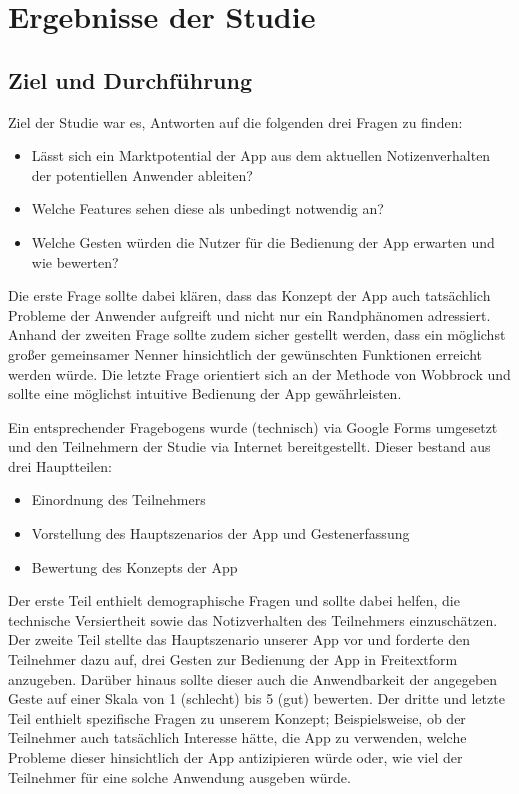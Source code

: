 \documentclass{chi-ext}
\begin{document}
\section{Ergebnisse der Studie}

\subsection{Ziel und Durchführung}
Ziel der Studie war es, Antworten auf die folgenden drei Fragen zu finden:
\begin{itemize}
\item Lässt sich ein Marktpotential der App aus dem aktuellen Notizenverhalten der potentiellen Anwender ableiten?
\item Welche Features sehen diese als unbedingt notwendig an?
\item Welche Gesten würden die Nutzer für die Bedienung der App erwarten und wie bewerten?
\end{itemize}

Die erste Frage sollte dabei klären, dass das Konzept der App auch tatsächlich Probleme der Anwender aufgreift und nicht nur ein Randphänomen adressiert. Anhand der zweiten Frage sollte zudem sicher gestellt werden, dass ein möglichst großer gemeinsamer Nenner hinsichtlich der gewünschten Funktionen erreicht werden würde. Die letzte Frage orientiert sich an der Methode von Wobbrock \cite{Wobbrock} und sollte eine möglichst intuitive Bedienung der App gewährleisten.

Ein entsprechender Fragebogens wurde (technisch) via Google Forms umgesetzt und den Teilnehmern der Studie via Internet bereitgestellt. Dieser bestand aus drei Hauptteilen:

\begin{itemize}
\item Einordnung des Teilnehmers
\item Vorstellung des Hauptszenarios der App und Gestenerfassung
\item Bewertung des Konzepts der App
\end{itemize}

Der erste Teil enthielt demographische Fragen und sollte dabei helfen, die technische Versiertheit sowie das Notizverhalten des Teilnehmers einzuschätzen.
Der zweite Teil stellte das Hauptszenario unserer App vor und forderte den Teilnehmer dazu auf, drei Gesten zur Bedienung der App in Freitextform anzugeben. Darüber hinaus sollte dieser auch die Anwendbarkeit der angegeben Geste auf einer Skala von 1 (schlecht) bis 5 (gut) bewerten.
Der dritte und letzte Teil enthielt spezifische Fragen zu unserem Konzept; Beispielsweise, ob der Teilnehmer auch tatsächlich Interesse hätte, die App zu verwenden, welche Probleme dieser hinsichtlich der App antizipieren würde oder, wie viel der Teilnehmer für eine solche Anwendung ausgeben würde.
\end{document}
